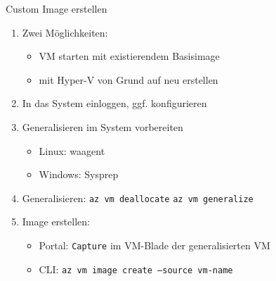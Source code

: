 \begin{flashcard}[Definition]{Custom Image erstellen}
    \begin{enumerate}
        \item Zwei Möglichkeiten:
            \begin{itemize}
                \item VM starten mit existierendem Basisimage
                \item mit Hyper-V von Grund auf neu erstellen
            \end{itemize}
        \item In das System einloggen, ggf. konfigurieren
        \item Generalisieren im System vorbereiten
            \begin{itemize}
                \item Linux: waagent
                \item Windows: Sysprep
            \end{itemize}
        \item Generalisieren: \newline
                \texttt{az vm deallocate}
                \texttt{az vm generalize}
        \item Image erstellen:
            \begin{itemize}
                \item Portal: \texttt{Capture} im VM-Blade der generalisierten VM
                \item CLI: \texttt{az vm image create --source vm-name}
            \end{itemize}

    \end{enumerate}
\end{flashcard}


